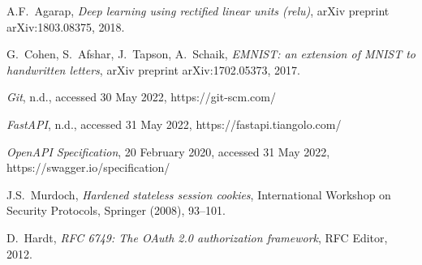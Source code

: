 \documentclass[12pt, a4paper]{report}
\begin{document}
\begin{thebibliography}{99}
A.F.~Agarap,
\emph{Deep learning using rectified linear units (relu)}, arXiv preprint arXiv:1803.08375, 2018.

G.~Cohen, S.~Afshar, J.~Tapson, A.~Schaik,
\emph{EMNIST: an extension of MNIST to handwritten letters}, arXiv preprint arXiv:1702.05373, 2017.

\emph{Git}, n.d., accessed 30 May 2022,
https://git-scm.com/

\emph{FastAPI}, n.d., accessed 31 May 2022,
https://fastapi.tiangolo.com/

\emph{OpenAPI Specification}, 20 February 2020, accessed 31 May 2022,
https://swagger.io/specification/

J.S.~Murdoch,
\emph{Hardened stateless session cookies},
International Workshop on Security Protocols, Springer (2008),  93--101.

D.~Hardt,
\emph{RFC 6749: The OAuth 2.0 authorization framework}, RFC Editor, 2012.
\end{thebibliography}
\end{document}
